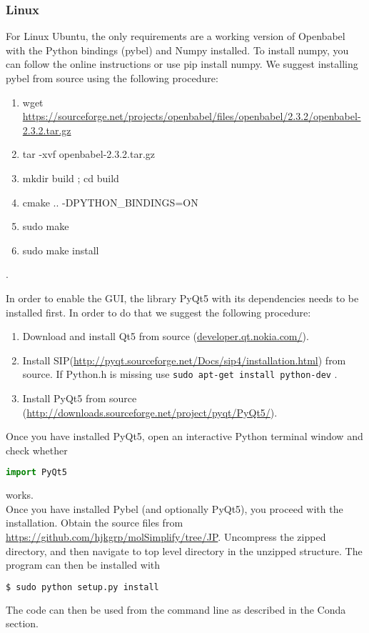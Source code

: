 \subsubsection{Linux}

For Linux Ubuntu, the only requirements are a working version of Openbabel with the Python bindings (pybel) and Numpy installed. To install numpy, you can follow the online instructions or use pip install numpy. We suggest installing pybel from source using the following procedure:
\begin{enumerate}
\item   wget \url{https://sourceforge.net/projects/openbabel/files/openbabel/2.3.2/openbabel-2.3.2.tar.gz}
\item  tar -xvf openbabel-2.3.2.tar.gz 
\item mkdir build ; cd build
\item cmake .. -DPYTHON\_BINDINGS=ON
\item sudo make
\item sudo make install
\end{enumerate}.

In order to enable the GUI, the library PyQt5 with its dependencies needs to be installed first. In order to do that we suggest the following procedure:
\begin{enumerate}
\item Download and install Qt5 from source (\url{developer.qt.nokia.com/}). 
\item Install SIP(\url{http://pyqt.sourceforge.net/Docs/sip4/installation.html}) from source. If Python.h is missing use \texttt{sudo apt-get install python-dev} . 
\item Install PyQt5 from source (\url{http://downloads.sourceforge.net/project/pyqt/PyQt5/}).
\end{enumerate}

Once you have installed PyQt5, open an interactive Python terminal window and check whether \begin{lstlisting}[language=python] import PyQt5 \end{lstlisting} works. \\

Once you have installed Pybel (and optionally PyQt5), you proceed with the installation. Obtain the source files from \url{https://github.com/hjkgrp/molSimplify/tree/JP}. Uncompress the zipped directory, and then navigate to top level directory in the unzipped structure. The program can then be installed with
\begin{lstlisting}[language=bash]
  $ sudo python setup.py install
\end{lstlisting} 
The code can then be used from the command line as described in the Conda section.

